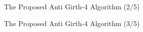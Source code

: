 \documentclass[11pt, aspectratio=169]{beamer}
\begin{document}
\begin{frame}{The Proposed Anti Girth-4 Algorithm (2/5)}
		

	
	
\end{frame}
\begin{frame}{The Proposed Anti Girth-4 Algorithm (3/5)}
	

\end{frame}
\end{document}
